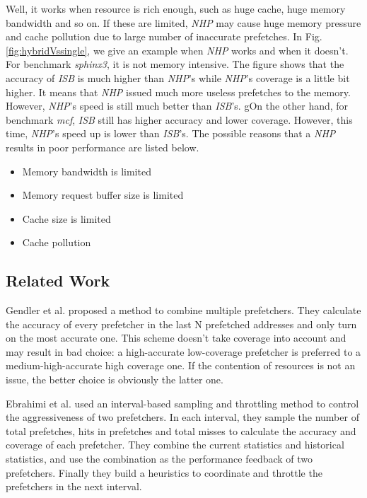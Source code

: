   Well, it works when resource is rich enough, such as huge cache, huge memory bandwidth and so on. If these are limited, \emph{NHP} may cause huge memory pressure and cache pollution due to large number of inaccurate prefetches. In Fig.\ref{fig:hybridVssingle}, we give an example when \emph{NHP} works and when it doesn't. 
 For benchmark \emph{sphinx3}, it is not memory intensive. The figure shows that the accuracy of \emph{ISB} is much higher than \emph{NHP}'s while \emph{NHP}'s coverage is a little bit higher. It means that \emph{NHP} issued much more useless prefetches to the memory. However, \emph{NHP}'s speed is still much better than \emph{ISB}'s. 
 gOn the other hand, for benchmark \emph{mcf}, \emph{ISB} still has higher accuracy and lower coverage. However, this time, \emph{NHP}'s speed up is lower than \emph{ISB}'s. The possible reasons that a \emph{NHP} results in poor performance are listed below.

  \begin{itemize}
    \item Memory bandwidth is limited
    \item Memory request buffer size is limited
    \item Cache size is limited
    \item Cache pollution
  \end{itemize}

  \subsection{Related Work}
  \label{sec:PrevSol}
  Gendler et al.\cite{gendlerpaper} proposed a method to combine multiple prefetchers. 
  They calculate the accuracy of every prefetcher in the last N prefetched addresses and only turn on the most accurate one. 
  This scheme doesn't take coverage into account and may result in bad choice: a high-accurate low-coverage prefetcher is preferred to a medium-high-accurate high coverage one. 
  If the contention of resources is not an issue, the better choice is obviously the latter one. \par
  Ebrahimi et al.\cite{yalepaper} used an interval-based sampling and throttling method to control the aggressiveness of two prefetchers. 
  In each interval, they sample the number of total prefetches, hits in prefetches and total misses to calculate the accuracy and coverage of each prefetcher. 
  They combine the current statistics and historical statistics, and use the combination as the performance feedback of two prefetchers. 
  Finally they build a heuristics to coordinate and throttle the prefetchers in the next interval.
  

